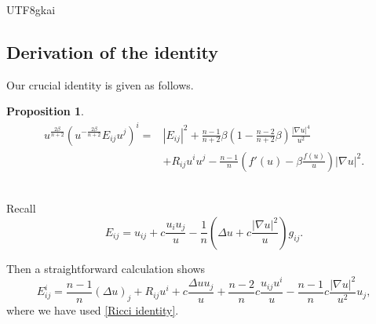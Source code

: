 \documentclass[reqno,12pt]{amsart}
\numberwithin{equation}{section}
\newtheorem{prop}[thm]{Proposition}
\begin{document}
\begin{CJK}{UTF8}{gkai}
 \subsection{Derivation of the identity}
 Our crucial identity is given as follows.
 \begin{prop}\label{prop1}
 	\begin{equation}\label{keyidentity}
 			\begin{aligned}
 			u^{\frac{2\beta}{n+2}}\left(u^{-\frac{2\beta}{n+2}}E_{ij}u^{j}\right)^{i}=&|E_{ij}|^{2}+\frac{n-1}{n+2}\beta\left(1-\frac{n-2}{n+2}\beta\right)\frac{|\nabla u|^{4}}{u^{2}}\\
 			&+R_{ij}u^{i}u^{j}-\frac{n-1}{n}\left(f'(u)-\beta\frac{f(u)}{u}\right)|\nabla u|^{2}.
 		\end{aligned}
 	\end{equation}
 \end{prop}
 \\
   Recall
   \begin{equation}\label{tensorEij}
   	 E_{ij}=u_{ij}+c\frac{u_{i}u_{j}}{u}-\frac{1}{n}\left(\Delta u+c\frac{|\nabla u|^{2}}{u}\right)g_{ij}.
   \end{equation}
  
   Then a straightforward calculation shows
   \begin{equation}\label{div1}
   	E_{ij}^{i}=\frac{n-1}{n}(\Delta u)_{j}+R_{ij}u^{i}+c\frac{\Delta u u_{j}}{u}+\frac{n-2}{n}c\frac{u_{ij}u^{i}}{u}-\frac{n-1}{n}c\frac{
   	|\nabla u|^{2}}{u^{2}}u_{j},
   \end{equation}
   where we have used \eqref{Ricci identity}.
   

\end{CJK}
\end{document}
